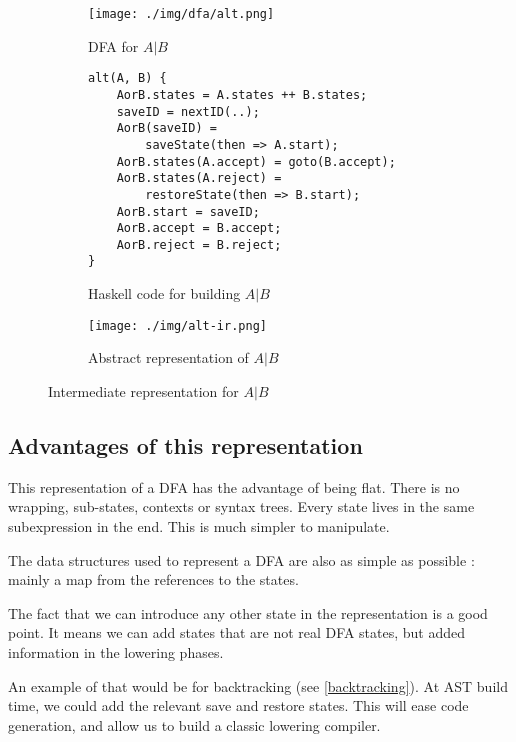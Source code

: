 \documentclass[11pt,a4paper]{report}
\newcommand{\regexp}[1]{$#1$}
\newcommand{\haskell}[1]{\textsf{#1}}
\begin{document}
\begin{figure}[h]
	\begin{subfigure}[h]{0.45\textwidth}
		\centering
		\texttt{[image: ./img/dfa/alt.png]}
		\caption{DFA for \regexp{A|B}}
	\end{subfigure}
	\hspace{0.05\textwidth}
	\begin{subfigure}[h]{0.45\textwidth}
		\centering
		\begin{lstlisting}[style=C]
alt(A, B) {
	AorB.states = A.states ++ B.states;
	saveID = nextID(..);
	AorB(saveID) = 
		saveState(then => A.start);
	AorB.states(A.accept) = goto(B.accept);
	AorB.states(A.reject) = 
		restoreState(then => B.start);
	AorB.start = saveID;
	AorB.accept = B.accept;
	AorB.reject = B.reject;
}
		\end{lstlisting}
		\caption{Haskell code for building \regexp{A|B}}
	\end{subfigure}
	
	\centering
	\begin{subfigure}[h]{0.85\textwidth}
		\centering
		\texttt{[image: ./img/alt-ir.png]}
		\caption{Abstract representation of \regexp{A|B}}
	\end{subfigure}
	\caption{Intermediate representation for \regexp{A|B}}
	\label{altir}
\end{figure}

\subsection{Advantages of this representation}

This representation of a DFA has the advantage of being flat. There is no wrapping, sub-states, contexts or syntax trees. Every state lives in the same subexpression in the end. This is much simpler to manipulate.

The data structures used to represent a DFA are also as simple as possible : mainly a map from the references to the states.

The fact that we can introduce any other state in the representation is a good point. It means we can add states that are not real DFA states, but added information in the lowering phases.

An example of that would be for backtracking (see \ref{backtracking}). At AST build time, we could add the relevant \haskell{save} and \haskell{restore} states. This will ease code generation, and allow us to build a classic lowering compiler.
\end{document}
